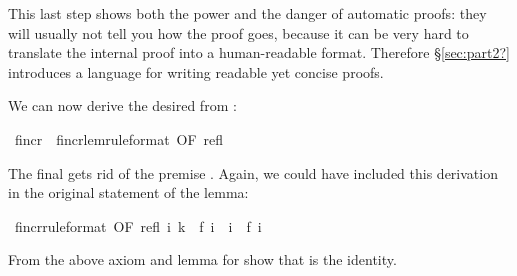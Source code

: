 \begin{isabellebody}
\begin{isamarkuptext}
This last step shows both the power and the danger of automatic proofs: they
will usually not tell you how the proof goes, because it can be very hard to
translate the internal proof into a human-readable format. Therefore
\S\ref{sec:part2?} introduces a language for writing readable yet concise
proofs.

We can now derive the desired  from :%
\end{isamarkuptext}%
\ f{\isacharunderscore}incr\ {\isacharequal}\ f{\isacharunderscore}incr{\isacharunderscore}lem{\isacharbrackleft}rule{\isacharunderscore}format{\isacharcomma}\ OF\ refl{\isacharbrackright}%
\begin{isamarkuptext}%
\noindent
The final  gets rid of the premise . Again,
we could have included this derivation in the original statement of the lemma:%
\end{isamarkuptext}%
\ f{\isacharunderscore}incr{\isacharbrackleft}rule{\isacharunderscore}format{\isacharcomma}\ OF\ refl{\isacharbrackright}{\isacharcolon}\ {\isachardoublequote}{\isasymforall}i{\isachardot}\ k\ {\isacharequal}\ f\ i\ {\isasymlongrightarrow}\ i\ {\isasymle}\ f\ i{\isachardoublequote}%
\begin{isamarkuptext}%
\begin{exercise}
From the above axiom and lemma for  show that  is the
identity.
\end{exercise}


\end{isamarkuptext}
\end{isabellebody}

